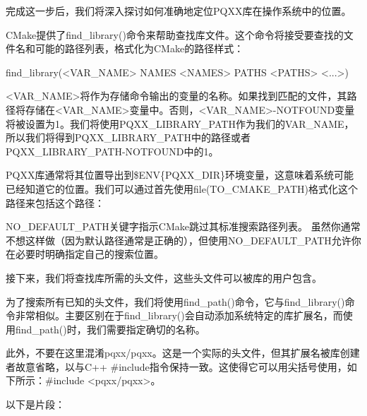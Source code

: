 完成这一步后，我们将深入探讨如何准确地定位PQXX库在操作系统中的位置。


CMake提供了find\_library()命令来帮助查找库文件。这个命令将接受要查找的文件名和可能的路径列表，格式化为CMake的路径样式：

\begin{shell}
find_library(<VAR_NAME> NAMES <NAMES> PATHS <PATHS> <...>)
\end{shell}

<VAR\_NAME>将作为存储命令输出的变量的名称。如果找到匹配的文件，其路径将存储在<VAR\_NAME>变量中。否则，<VAR\_NAME>-NOTFOUND变量将被设置为1。我们将使用PQXX\_LIBRARY\_PATH作为我们的VAR\_NAME，所以我们将得到PQXX\_LIBRARY\_PATH中的路径或者PQXX\_LIBRARY\_PATH-NOTFOUND中的1。

PQXX库通常将其位置导出到\$ENV\{PQXX\_DIR\}环境变量，这意味着系统可能已经知道它的位置。我们可以通过首先使用file(TO\_CMAKE\_PATH)格式化这个路径来包括这个路径：



NO\_DEFAULT\_PATH关键字指示CMake跳过其标准搜索路径列表。 虽然你通常不想这样做（因为默认路径通常是正确的），但使用NO\_DEFAULT\_PATH允许你在必要时明确指定自己的搜索位置。

接下来，我们将查找库所需的头文件，这些头文件可以被库的用户包含。


为了搜索所有已知的头文件，我们将使用find\_path()命令，它与find\_library()命令非常相似。主要区别在于find\_library()会自动添加系统特定的库扩展名，而使用find\_path()时，我们需要指定确切的名称。

此外，不要在这里混淆pqxx/pqxx。这是一个实际的头文件，但其扩展名被库创建者故意省略，以与C++ \#include指令保持一致。这使得它可以用尖括号使用，如下所示：\#include <pqxx/pqxx>。

以下是片段：



